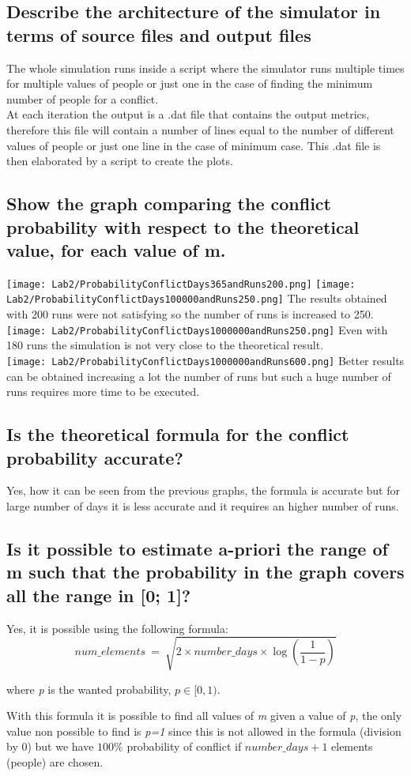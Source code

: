 \documentclass{report}
\begin{document}
	\subsection{Describe the architecture of the simulator in terms of source files and output files}
			The whole simulation runs inside a script where the simulator runs multiple times for multiple values of people or just one in the case of finding the minimum number of people for a conflict. \\
			At each iteration the output is a .dat file that contains the output metrics, therefore this file will contain a number of lines equal to the number of different values of people or just one line in the case of minimum case. This .dat file is then elaborated by a script to create the plots.
		
		\subsection{Show the graph comparing the conflict probability with respect to the theoretical value,
for each value of m.}
				\texttt{[image: Lab2/ProbabilityConflictDays365andRuns200.png]}
				\texttt{[image: Lab2/ProbabilityConflictDays100000andRuns250.png]}
				The results obtained with 200 runs were not satisfying so the number of runs is increased to 250.
				\texttt{[image: Lab2/ProbabilityConflictDays1000000andRuns250.png]}
				Even with 180 runs the simulation is not very close to the theoretical result. \\
				\texttt{[image: Lab2/ProbabilityConflictDays1000000andRuns600.png]}
				Better results can be obtained increasing a lot the number of runs but such a huge number of runs requires more time to be executed.
				
		\subsection{Is the theoretical formula for the conflict probability accurate?}
				Yes, how it can be seen from the previous graphs, the formula is accurate but for large number of days it is less accurate and it requires an higher number of runs.
				
		\subsection{Is it possible to estimate a-priori the range of m such that the probability in the graph covers all the range in [0; 1]?}
				Yes, it is possible using the following formula:
				\[
						num\_elements \: = \: \sqrt{2 \times number\_days \times \log{ \left( \frac{1}{1-p} \right) } }
				\]
				\begin{center}
							where \emph{p} is the wanted probability, $ p \in [0,1)$.
				\end{center}
		With this formula it is possible to find all values of \emph{m} given a value of \emph{p}, the only value non possible to find is \emph{p=1} since this is not allowed in the formula (division by 0) but we have $100\%$ probability of conflict if $number\_days+1$ elements (people) are chosen.
		
\end{document}
